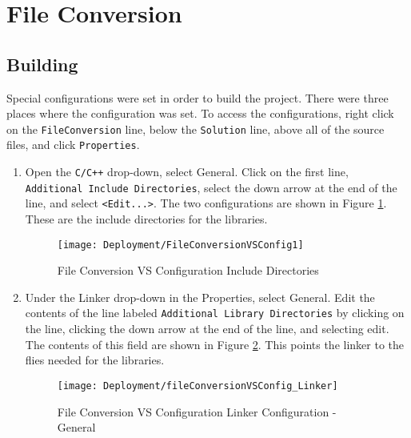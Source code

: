 
\section{File Conversion}

    \subsection{Building}

        Special configurations were set in order to build the project.  There were three places where the configuration was set.  To access the configurations, right click on the \texttt{FileConversion} line, below the \texttt{Solution} line, above all of the source files, and click \texttt{Properties}.  
        
        \begin{enumerate}
            \item Open the \texttt{C/C++} drop-down, select General.  Click on the first line, \texttt{Additional Include Directories}, select the down arrow at the end of the line, and select \texttt{<Edit...>}.  The two configurations are shown in Figure \ref{fig:fileconversionVSConfig1}.  These are the include directories for the libraries.   

            \begin{figure}[H]
                \texttt{[image: Deployment/FileConversionVSConfig1]}
                \centering
                \caption{File Conversion VS Configuration Include Directories}
                \label{fig:fileconversionVSConfig1}
            \end{figure}

            \item Under the Linker drop-down in the Properties, select General.  Edit the contents of the line labeled \texttt{Additional Library Directories} by clicking on the line, clicking the down arrow at the end of the line, and selecting edit.  The contents of this field are shown in Figure \ref{fig:fileconversionVSConfig2}.  This points the linker to the flies needed for the libraries.

            \begin{figure}[H]
                \texttt{[image: Deployment/fileConversionVSConfig\_Linker]}
                \centering
                \caption{File Conversion VS Configuration Linker Configuration - General}
                \label{fig:fileconversionVSConfig2}
            \end{figure}


\end{enumerate}
